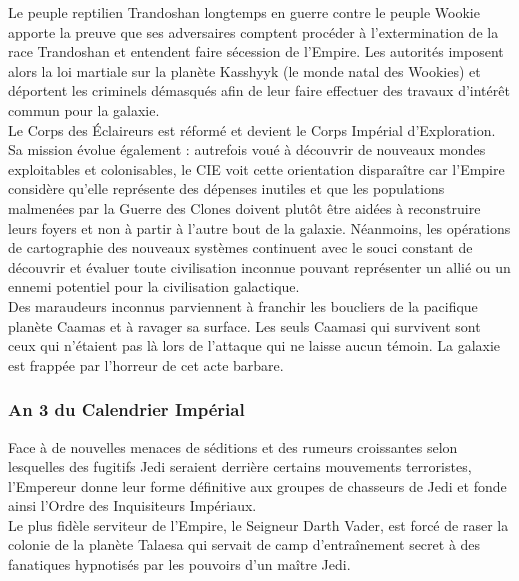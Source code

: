 \documentclass[twoside]{article}
\begin{document}
Le peuple reptilien Trandoshan longtemps en guerre contre le peuple Wookie apporte la preuve que ses adversaires comptent procéder à l'extermination de la race Trandoshan et entendent faire sécession de l'Empire. Les autorités imposent alors la loi martiale sur la planète Kasshyyk (le monde natal des Wookies) et déportent les criminels démasqués afin de leur faire effectuer des travaux d’intérêt commun pour la galaxie.\\

Le Corps des Éclaireurs est réformé et devient le Corps Impérial d'Exploration. Sa mission évolue également : autrefois voué à découvrir de nouveaux mondes exploitables et colonisables, le CIE voit cette orientation dispara\^{i}tre car l'Empire considère qu'elle représente des dépenses inutiles et que les populations malmenées par la Guerre des Clones doivent plutôt être aidées à reconstruire leurs foyers et non à partir à l'autre bout de la galaxie. Néanmoins, les opérations de cartographie des nouveaux systèmes continuent avec le souci constant de découvrir et évaluer toute civilisation inconnue pouvant représenter un allié ou un ennemi potentiel pour la civilisation galactique.\\

Des maraudeurs inconnus parviennent à franchir les boucliers de la pacifique planète Caamas et à ravager sa surface. Les seuls Caamasi qui survivent sont ceux qui n'étaient pas là lors de l'attaque qui ne laisse aucun témoin. La galaxie est frappée par l'horreur de cet acte barbare.

\subsubsection*{An 3 du Calendrier Impérial}
Face à de nouvelles menaces de séditions et des rumeurs croissantes selon lesquelles des fugitifs Jedi seraient derrière certains mouvements terroristes, l'Empereur donne leur forme définitive aux groupes de chasseurs de Jedi et fonde ainsi l'Ordre des Inquisiteurs Impériaux.\\

Le plus fidèle serviteur de l'Empire, le Seigneur Darth Vader, est forcé de raser la colonie de la planète Talaesa qui servait de camp d'entra\^{i}nement secret à des fanatiques hypnotisés par les pouvoirs d'un ma\^{i}tre Jedi.\\
\end{document}
